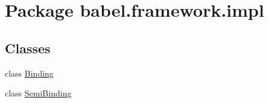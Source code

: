 \hypertarget{namespacebabel_1_1framework_1_1impl}{\section{Package babel.\-framework.\-impl}
\label{namespacebabel_1_1framework_1_1impl}
}
\subsection*{Classes}
\begin{DoxyCompactItemize}
\item 
class \hyperlink{classbabel_1_1framework_1_1impl_1_1_binding}{Binding}
\item 
class \hyperlink{classbabel_1_1framework_1_1impl_1_1_semi_binding}{Semi\-Binding}
\end{DoxyCompactItemize}

